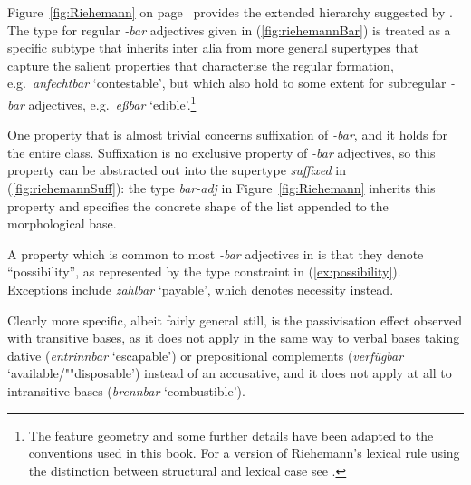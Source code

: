 \documentclass[output=paper,biblatex,babelshorthands,newtxmath,draftmode,colorlinks,citecolor=brown]{langscibook}
\begin{document}
Figure~\ref{fig:Riehemann} on page~\pageref{fig:Riehemann} provides the extended hierarchy suggested
by \citet{Riehemann98}. The type for regular \textit{-bar} adjectives
given in (\ref{fig:riehemannBar}) is treated as a specific subtype
that inherits inter alia from more general supertypes that capture the
salient properties that characterise the regular formation,
e.g.\ \textit{anfechtbar} `contestable', but which also hold to some
extent for subregular \textit{-bar} adjectives, e.g.\ \textit{eßbar}
`edible'.\footnote{%
  The feature geometry and some further details have been adapted to
  the conventions used in this
  book. For a version of Riehemann's lexical rule using the distinction between structural and
  lexical case  see .}
 
  
One property that is almost trivial concerns suffixation of
\textit{-bar}, and it holds for the entire class. Suffixation is no
exclusive property of \textit{-bar} adjectives, so this property can
be abstracted out into the supertype \textit{suffixed} in
(\ref{fig:riehemannSuff}): the type \textit{bar-adj} in
Figure~\ref{fig:Riehemann} inherits this property and specifies the
concrete shape of the list appended to the morphological base.

\ea
	\label{fig:riehemannSuff}
\z


\begin{sloppypar}
  A property which is common to most \textit{-bar} adjectives in
   is that they denote ``possibility'', as represented by the
  type constraint in (\ref{ex:possibility}). Exceptions include
  \textit{zahlbar} `payable', which denotes necessity instead. 
\end{sloppypar}

\begin{exe}

  \ex \label{ex:possibility}
\end{exe}

Clearly more specific, albeit fairly general still, is the
passivisation effect observed with transitive bases, as it does not
apply in the same way to verbal bases taking dative
(\textit{entrinnbar} `escapable') or prepositional complements
(\textit{verfügbar} `available/""disposable') instead of an
accusative, and it does not apply at all to intransitive bases
(\textit{brennbar} `combustible').
\end{document}
